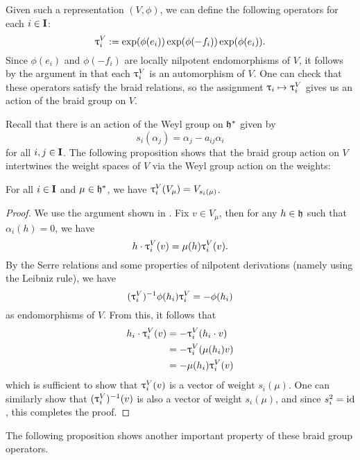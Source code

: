 Given such a representation $(V,\phi)$, we can define the following operators for each $i\in\mathbf{I}$:
\[\uptau_i^V := \exp(\phi(e_i))\exp(\phi(-f_i))\exp(\phi(e_i)).\]
Since $\phi(e_i)$ and $\phi(-f_i)$ are locally nilpotent endomorphisms of $V$, it follows by the argument in \cite[\S21.2]{humphreys_introduction_1972} that each $\uptau_i^V$ is an automorphism of $V$.
One can check that these operators satisfy the braid relations, so the assignment $\uptau_i\mapsto\uptau_i^V$ gives us an action of the braid group on $V$.

Recall that there is an action of the Weyl group on $\mathfrak{h}^*$ given by
\[s_i(\alpha_j) = \alpha_j - a_{ij}\alpha_i\]
for all $i,j\in\mathbf{I}$.
The following proposition shows that the braid group action on $V$ intertwines the weight spaces of $V$ via the Weyl group action on the weights:

\begin{proposition}\label{P:tau-wt-space}
    For all $i\in\mathbf{I}$ and $\mu\in\mathfrak{h}^*$, we have $\uptau_i^V(V_\mu)=V_{s_i(\mu)}$.
\end{proposition}
\begin{proof}
    We use the argument shown in \cite[\S1.3]{kumar_kac-moody_2002}.
    Fix $v\in V_\mu$, then for any $h\in\mathfrak{h}$ such that $\alpha_i(h)=0$, we have
    \[h\cdot \uptau_i^V(v) = \mu(h)\uptau_i^V(v).\]
    By the Serre relations and some properties of nilpotent derivations (namely using the Leibniz rule), we have
    \[(\uptau_i^V)^{-1}\phi(h_i)\uptau_i^V = -\phi(h_i)\]
    as endomorphisms of $V$.
    From this, it follows that
    \begin{align*}
        h_i\cdot\uptau_i^V(v) &= -\uptau_i^V(h_i\cdot v) \\
        &= -\uptau_i^V(\mu(h_i)v) \\
        &= -\mu(h_i)\uptau_i^V(v)
    \end{align*}
    which is sufficient to show that $\uptau_i^V(v)$ is a vector of weight $s_i(\mu)$.
    One can similarly show that $(\uptau_i^V)^{-1}(v)$ is also a vector of weight $s_i(\mu)$, and since $s_i^2={\operatorname{id}}$, this completes the proof.
\end{proof}

The following proposition shows another important property of these braid group operators.

